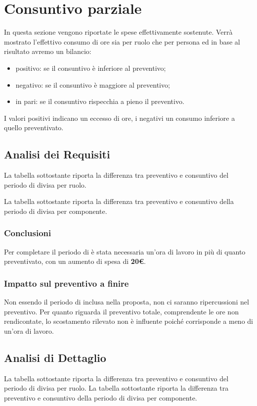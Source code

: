 \section{Consuntivo parziale}
In questa sezione vengono riportate le spese effettivamente sostenute. Verrà mostrato l'effettivo consumo di ore sia per ruolo che per persona ed in base al risultato avremo un bilancio:
\begin{itemize}
	\item positivo: se il consuntivo è inferiore al preventivo;
	\item negativo: se il consuntivo è maggiore al preventivo;
	\item in pari: se il consuntivo rispecchia a pieno il preventivo.
\end{itemize}
I valori positivi indicano un eccesso di ore, i negativi un consumo inferiore a quello preventivato.

\subsection{Analisi dei Requisiti}
La tabella sottostante riporta la differenza tra preventivo e consuntivo del periodo di \AR{} divisa per ruolo.

La tabella sottostante riporta la differenza tra preventivo e consuntivo della periodo di \AR{} divisa per componente.
\subsubsection{Conclusioni}
Per completare il periodo di \AR{} è stata necessaria un'ora di lavoro in più di quanto preventivato, con un aumento di spesa di \textbf{20€}.
\subsubsection{Impatto sul preventivo a finire}
Non essendo il periodo di \AR{} inclusa nella proposta, non ci saranno ripercussioni nel preventivo. Per quanto riguarda il preventivo totale, comprendente le ore non rendicontate, lo scostamento rilevato non è influente poiché corrisponde a meno di un'ora di lavoro.

\subsection{Analisi di Dettaglio}
La tabella sottostante riporta la differenza tra preventivo e consuntivo del periodo di \AD{} divisa per ruolo.
La tabella sottostante riporta la differenza tra preventivo e consuntivo della periodo di \AD{} divisa per componente.
